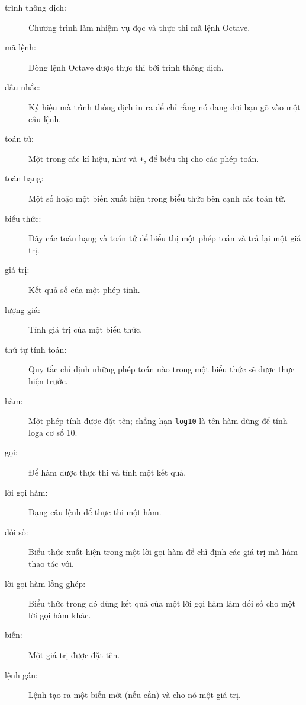 \documentclass[12pt]{book}
\begin{document}
\begin{description}

\item[trình thông dịch:] Chương trình làm nhiệm vụ đọc và thực thi mã lệnh Octave.

\item[mã lệnh:] Dòng lệnh Octave được thực thi bởi trình thông dịch.

\item[dấu nhắc:] Ký hiệu mà trình thông dịch in ra để chỉ rằng nó đang 
đợi bạn gõ vào một câu lệnh.

\item[toán tử:] Một trong các kí hiệu, như {\tt *} và {\tt +}, để biểu thị cho 
các phép toán.

\item[toán hạng:] Một số hoặc một biến xuất hiện trong biểu thức bên cạnh 
các toán tử.

\item[biểu thức:] Dãy các toán hạng và toán tử để biểu thị một phép toán 
và trả lại một giá trị.

\item[giá trị:] Kết quả số của một phép tính.

\item[lượng giá:] Tính giá trị của một biểu thức.

\item[thứ tự tính toán:] Quy tắc chỉ định những phép toán nào trong một 
biểu thức sẽ được thực hiện trước.

\item[hàm:] Một phép tính được đặt tên; chẳng hạn {\tt log10} là tên hàm
dùng để tính loga cơ số 10.

\item[gọi:] Để hàm được thực thi và tính một kết quả.

\item[lời gọi hàm:] Dạng câu lệnh để thực thi một hàm.

\item[đối số:] Biểu thức xuất hiện trong một lời gọi hàm để chỉ định các
giá trị mà hàm thao tác với.

\item[lời gọi hàm lồng ghép:] Biểu thức trong đó dùng kết quả của một 
lời gọi hàm làm đối số cho một lời gọi hàm khác.

\item[biến:] Một giá trị được đặt tên.   

\item[lệnh gán:] Lệnh tạo ra một biến mới (nếu cần) và cho nó một
giá trị.


\end{description}
\end{document}
